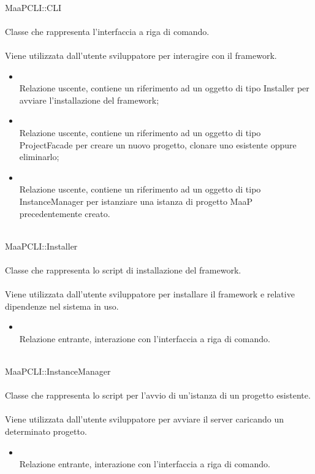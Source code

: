 	\\
	MaaPCLI::CLI\\
	\\
	Classe che rappresenta l'interfaccia a riga di comando.\\
	\\
	Viene utilizzata dall'utente sviluppatore per interagire con il framework.\\
	\begin{itemize}
	\item{}\\
	Relazione uscente, contiene un riferimento ad un oggetto di tipo Installer per avviare l'installazione del framework;
	\item{}\\
	Relazione uscente, contiene un riferimento ad un oggetto di tipo ProjectFacade per creare un nuovo progetto, clonare uno esistente oppure eliminarlo;
	\item{}\\
	Relazione uscente, contiene un riferimento ad un oggetto di tipo InstanceManager per istanziare una istanza di progetto MaaP precedentemente creato.
	\end{itemize}
	
	\\
	MaaPCLI::Installer\\
	\\
	Classe che rappresenta lo script di installazione del framework.\\
	\\
	Viene utilizzata dall'utente sviluppatore per installare il framework e relative dipendenze nel sistema in uso.\\
	\begin{itemize}
	\item{}\\
	Relazione entrante, interazione con l'interfaccia a riga di comando.
	\end{itemize}
	
	\\
	MaaPCLI::InstanceManager\\
	\\
	Classe che rappresenta lo script per l'avvio di un'istanza di un progetto esistente.\\
	\\
	Viene utilizzata dall'utente sviluppatore per avviare il server caricando un determinato progetto.\\
	\begin{itemize}
	\item{}\\
	Relazione entrante, interazione con l'interfaccia a riga di comando.
	\end{itemize}
	
